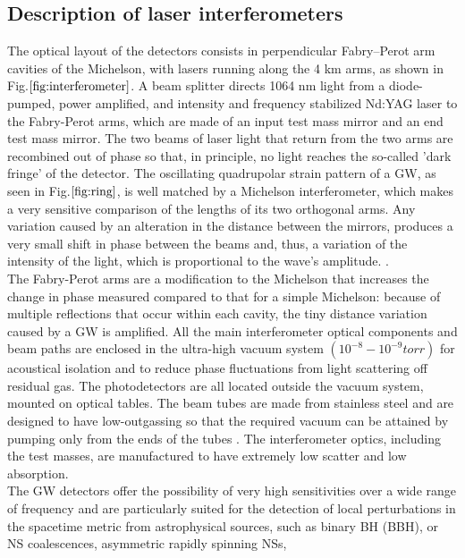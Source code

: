 \documentclass[binding=0.6cm, LaM]{sapthesis}
\begin{document}
\subsection{Description of laser interferometers}

	The optical layout of the detectors consists in perpendicular 
	Fabry–Perot arm cavities of the Michelson, 
	with lasers running along the 4 km arms, as shown in Fig.$\ref{fig:interferometer}$. 
	A beam splitter directs 1064 nm light from a diode-pumped, power amplified, 
	and intensity and frequency stabilized Nd:YAG laser to the Fabry-Perot arms, 
	which are made of an input test mass mirror and an end test mass mirror. 
	The two beams of laser light that return from the two arms are recombined out of phase so that, 
	in principle, no light reaches the so-called 'dark fringe' of the detector. 
	The oscillating quadrupolar strain pattern of a GW, 
	as seen in Fig.$\ref{fig:ring}$, is well matched by a Michelson interferometer,
        which makes a very sensitive comparison of the lengths of its two orthogonal arms.
	Any variation caused by an alteration in the distance between the mirrors, 
	produces a very small shift in phase between the beams and, thus, 
	a variation of the intensity of the light, which is proportional to the wave's amplitude. \cite{10}. \\
	The Fabry-Perot arms are a modification to the Michelson 
	that increases the change in phase measured compared to that for a simple Michelson: 
	because of multiple reflections that occur within each cavity, 
	the tiny distance variation caused by a GW is amplified. 
	All the main interferometer optical components and beam paths are enclosed in the ultra-high vacuum system
        $(10^{−8} - 10^{−9} torr)$ for acoustical isolation and to reduce phase fluctuations from light scattering off residual gas.
        The photodetectors are all located outside the vacuum system, mounted on optical tables.
        The beam tubes are made from stainless steel and are designed to have low-outgassing
        so that the required vacuum can be attained by pumping only from the ends of the tubes \cite{11}. 
        The interferometer optics, including the test masses, are manufactured to have extremely low scatter and low absorption. \\
	The GW detectors offer the possibility of very high sensitivities over a wide range of frequency and
        are particularly suited for the detection of local perturbations in the spacetime metric from astrophysical sources,
        such as binary BH (BBH), or NS coalescences, asymmetric rapidly spinning NSs,
\end{document}

